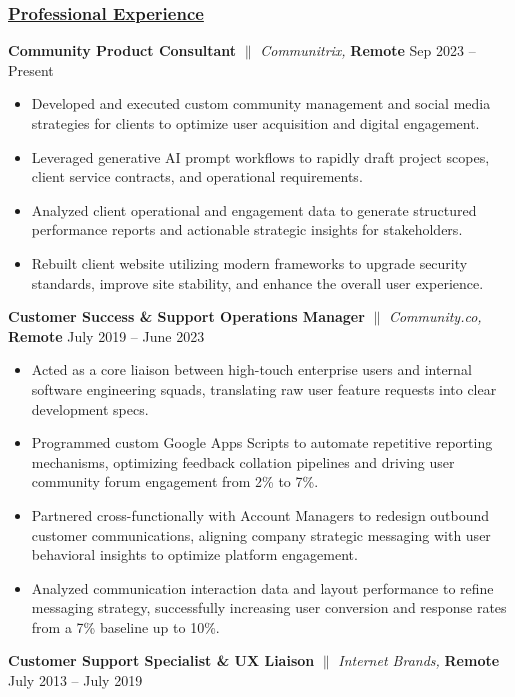 \documentclass[a4paper,10pt]{article}
\begin{document}
\subsubsection{\underline{Professional Experience}}
{\textbf{Community Product Consultant} $\parallel$ \textit{Communitrix,}  \textbf{Remote} \hfill {Sep 2023 – Present}}
\begin{itemize}
      \item Developed and executed custom community management and social media strategies for clients to optimize user acquisition and digital engagement.
      \item Leveraged generative AI prompt workflows to rapidly draft project scopes, client service contracts, and operational requirements.
      \item Analyzed client operational and engagement data to generate structured performance reports and actionable strategic insights for stakeholders.
      \item Rebuilt client website utilizing modern frameworks to upgrade security standards, improve site stability, and enhance the overall user experience.
\end{itemize}
\vspace{2mm}
{\textbf{Customer Success \& Support Operations Manager} $\parallel$ \textit{Community.co,}  \textbf{Remote} \hfill {July 2019 – June 2023}}
\begin{itemize}
      \item Acted as a core liaison between high-touch enterprise users and internal software engineering squads, translating raw user feature requests into clear development specs.
      \item Programmed custom Google Apps Scripts to automate repetitive reporting mechanisms, optimizing feedback collation pipelines and driving user community forum engagement from 2\% to 7\%.
      \item Partnered cross-functionally with Account Managers to redesign outbound customer communications, aligning company strategic messaging with user behavioral insights to optimize platform engagement.
      \item Analyzed communication interaction data and layout performance to refine messaging strategy, successfully increasing user conversion and response rates from a 7\% baseline up to 10\%.
\end{itemize}
\vspace{2mm}
{\textbf{Customer Support Specialist \& UX Liaison} $\parallel$ \textit{Internet Brands,}  \textbf{Remote} \hfill {July 2013 – July 2019}}
\end{document}

